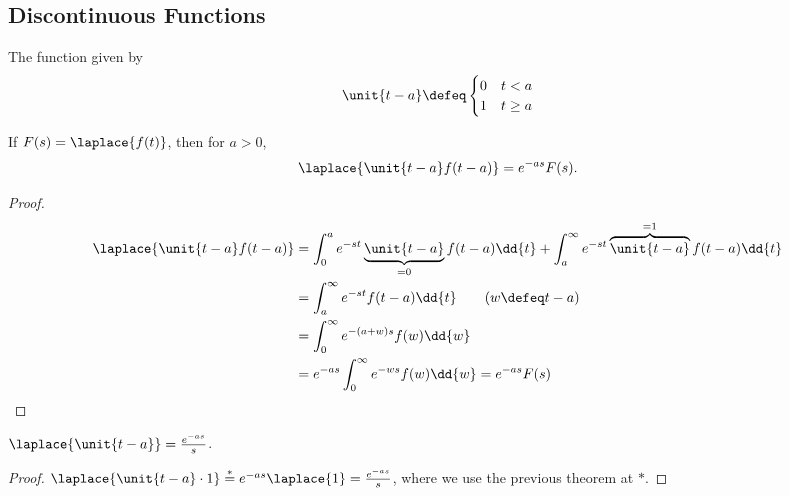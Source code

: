 \subsection{Discontinuous Functions}

\begin{definition}
    The function given by \[
    \unit{t - a} \defeq \begin{cases}
        0 & t < a\\
        1 & t \geq a
    \end{cases}    
    \]
\end{definition}

\begin{theorem}
    If $F(s)  = \laplace{f(t)}$, then for $a > 0$, \[
    \laplace{\unit{t - a} f(t - a)}     = e^{-as} F(s).
    \]
\end{theorem}

\begin{proof}
    \begin{align*}
        \laplace{\unit{t - a} f(t - a)} &= \int_0^a e^{-st} \underbrace{\unit{t - a}}_{=0} f(t - a) \dd{t} + \int_a^\infty e^{-st} \overbrace{\unit{t - a}}^{=1} f(t - a) \dd{t}\\
        &= \int_a^ \infty e^{-st} f(t - a) \dd{t} \qquad (w \defeq t - a)\\
        &= \int_0^\infty e^{-(a + w)s} f(w) \dd{w} \\
        &= e^{-as} \int_0^\infty e^{-w s} f(w) \dd{w} = e^{-as} F(s)
    \end{align*}
\end{proof}

\begin{corollary}
    $\laplace{\unit{t - a}} = \frac{e^{-as}}{s}$.
\end{corollary}

\begin{proof}
    $\laplace{\unit{t - a} \cdot 1} \overset{\ast}{=} e^{-as} \laplace{1} = \frac{e^{-as}}{s}$, where we use the previous theorem at $\ast$.
\end{proof}